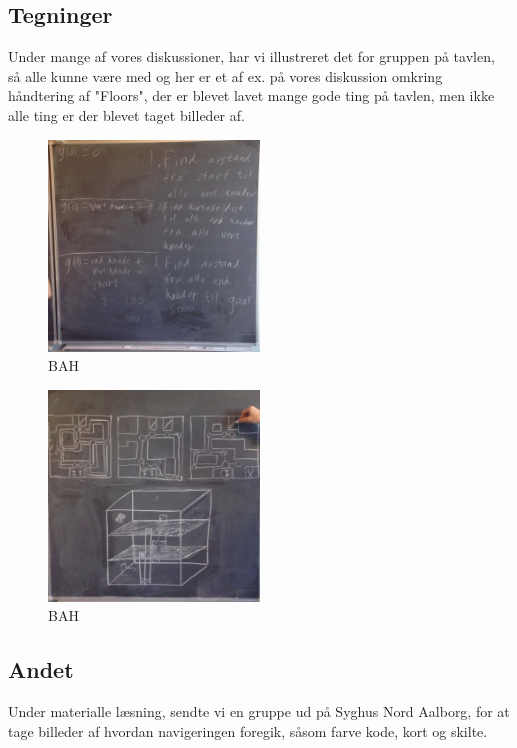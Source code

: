 \documentclass[a4paper,12pt,twoside,openright]{memoir}
\begin{document}
        \subsection{Tegninger}
        Under mange af vores diskussioner, har vi illustreret det for gruppen på tavlen, så alle kunne være  med og her er et af ex. på vores diskussion omkring håndtering af "Floors", der er blevet lavet mange gode ting på tavlen, men ikke alle ting er der blevet taget billeder af.

        \begin{figure}[ht!]
            \centering
            \includegraphics[width=0.5\textwidth]{Images/5.jpg}
            \caption{BAH}
            \label{4}
        \end{figure}

        \begin{figure}[ht!]
            \centering
            \includegraphics[width=0.5\textwidth]{Images/6.jpg}
            \caption{BAH}
            \label{4}
        \end{figure}

        \subsection{Andet}
        Under materialle læsning, sendte vi en gruppe ud på Syghus Nord Aalborg, for at tage billeder af hvordan navigeringen foregik, såsom farve kode, kort og skilte.
\end{document}
